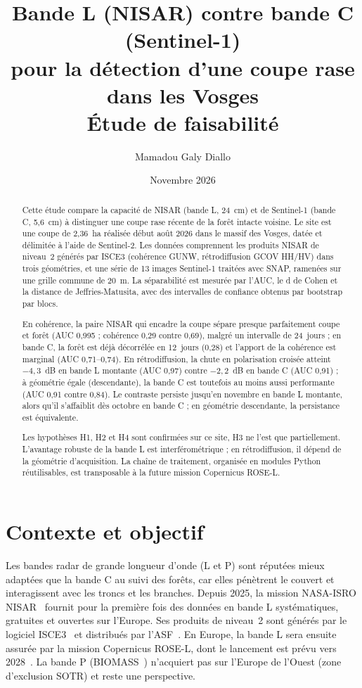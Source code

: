 \documentclass[11pt,a4paper]{article}
\title{Bande L (NISAR) contre bande C (Sentinel-1)\\pour la détection d'une coupe rase dans les Vosges\\[0.4em]
\large Étude de faisabilité}
\author{Mamadou Galy Diallo}
\date{Novembre 2026}
\begin{document}
\maketitle

\begin{abstract}
\noindent
Cette étude compare la capacité de NISAR (bande L, 24~cm) et de Sentinel-1 (bande C, 5,6~cm) à distinguer une
coupe rase récente de la forêt intacte voisine. Le site est une coupe de 2,36~ha réalisée début août 2026 dans le
massif des Vosges, datée et délimitée à l'aide de Sentinel-2. Les données comprennent les produits NISAR de
niveau~2 générés par ISCE3 (cohérence GUNW, rétrodiffusion GCOV HH/HV) dans trois géométries, et une série de
13 images Sentinel-1 traitées avec SNAP, ramenées sur une grille commune de 20~m. La séparabilité est mesurée par
l'AUC, le d de Cohen et la distance de Jeffries-Matusita, avec des intervalles de confiance obtenus par bootstrap
par blocs.

En cohérence, la paire NISAR qui encadre la coupe sépare presque parfaitement coupe et forêt (AUC 0,995 ;
cohérence 0,29 contre 0,69), malgré un intervalle de 24~jours ; en bande C, la forêt est déjà décorrélée en
12~jours (0,28) et l'apport de la cohérence est marginal (AUC 0,71--0,74). En rétrodiffusion, la chute en
polarisation croisée atteint $-4{,}3$~dB en bande L montante (AUC 0,97) contre $-2{,}2$~dB en bande C (AUC 0,91) ;
à géométrie égale (descendante), la bande C est toutefois au moins aussi performante (AUC 0,91 contre 0,84). Le
contraste persiste jusqu'en novembre en bande L montante, alors qu'il s'affaiblit dès octobre en bande C ; en
géométrie descendante, la persistance est équivalente.

Les hypothèses H1, H2 et H4 sont confirmées sur ce site, H3 ne l'est que partiellement. L'avantage robuste de la
bande L est interférométrique ; en rétrodiffusion, il dépend de la géométrie d'acquisition. La chaîne de
traitement, organisée en modules Python réutilisables, est transposable à la future mission Copernicus ROSE-L.
\end{abstract}

\tableofcontents
\newpage

\section{Contexte et objectif}

Les bandes radar de grande longueur d'onde (L et P) sont réputées mieux adaptées que la bande C au suivi des
forêts, car elles pénètrent le couvert et interagissent avec les troncs et les branches. Depuis 2025, la mission NASA-ISRO NISAR~\cite{kellogg2020nisar,nisar2018handbook}
fournit pour la première fois des données en bande L systématiques, gratuites et ouvertes sur l'Europe. Ses
produits de niveau~2 sont générés par le logiciel ISCE3~\cite{isce3} et distribués par l'ASF~\cite{asf2026nisar}.
En Europe, la bande L sera ensuite assurée par la mission Copernicus ROSE-L, dont le lancement est prévu vers
2028~\cite{esa2020rosel}. La bande P (BIOMASS~\cite{quegan2019biomass}) n'acquiert pas sur l'Europe de l'Ouest
(zone d'exclusion SOTR) et reste une perspective.
\end{document}

